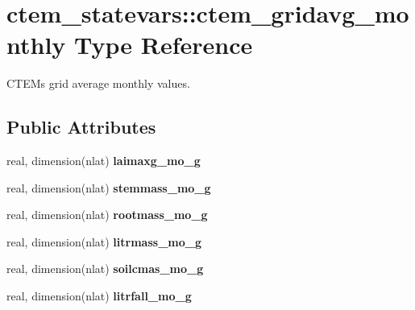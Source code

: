 \hypertarget{structctem__statevars_1_1ctem__gridavg__monthly}{}\section{ctem\+\_\+statevars\+:\+:ctem\+\_\+gridavg\+\_\+monthly Type Reference}
\label{structctem__statevars_1_1ctem__gridavg__monthly}


C\+T\+E\+M\textquotesingle{}s grid average monthly values.  


\subsection*{Public Attributes}
\begin{DoxyCompactItemize}
\item 
\hypertarget{structctem__statevars_1_1ctem__gridavg__monthly_a27685f90ea771b977efbf4028a321f2d}{}real, dimension(nlat) {\bfseries laimaxg\+\_\+mo\+\_\+g}\label{structctem__statevars_1_1ctem__gridavg__monthly_a27685f90ea771b977efbf4028a321f2d}

\item 
\hypertarget{structctem__statevars_1_1ctem__gridavg__monthly_a86a2e6bc43e5b765645730bf642a45e8}{}real, dimension(nlat) {\bfseries stemmass\+\_\+mo\+\_\+g}\label{structctem__statevars_1_1ctem__gridavg__monthly_a86a2e6bc43e5b765645730bf642a45e8}

\item 
\hypertarget{structctem__statevars_1_1ctem__gridavg__monthly_aea20191059d07ae608969a984e90ce87}{}real, dimension(nlat) {\bfseries rootmass\+\_\+mo\+\_\+g}\label{structctem__statevars_1_1ctem__gridavg__monthly_aea20191059d07ae608969a984e90ce87}

\item 
\hypertarget{structctem__statevars_1_1ctem__gridavg__monthly_ad6cdbf3429c83d17c2291eb624f658cc}{}real, dimension(nlat) {\bfseries litrmass\+\_\+mo\+\_\+g}\label{structctem__statevars_1_1ctem__gridavg__monthly_ad6cdbf3429c83d17c2291eb624f658cc}

\item 
\hypertarget{structctem__statevars_1_1ctem__gridavg__monthly_a1f4b3db62391dd5afa40e645430dfafa}{}real, dimension(nlat) {\bfseries soilcmas\+\_\+mo\+\_\+g}\label{structctem__statevars_1_1ctem__gridavg__monthly_a1f4b3db62391dd5afa40e645430dfafa}

\item 
\hypertarget{structctem__statevars_1_1ctem__gridavg__monthly_ab045b5df1d15274e4f78ee295343d7b0}{}real, dimension(nlat) {\bfseries litrfall\+\_\+mo\+\_\+g}\label{structctem__statevars_1_1ctem__gridavg__monthly_ab045b5df1d15274e4f78ee295343d7b0}


\end{DoxyCompactItemize}

